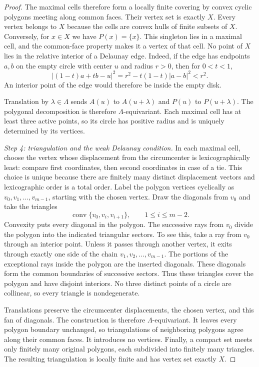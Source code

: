 \documentclass[11pt,a4paper]{article}
\theoremstyle{definition}
\theoremstyle{remark}
\DeclareMathOperator{\conv}{conv}
\begin{document}
\begin{proof}
The maximal cells therefore form a locally finite covering by convex
cyclic polygons meeting along common faces. Their vertex set is exactly
$X$. Every vertex belongs to $X$ because the cells are convex hulls of
finite subsets of $X$. Conversely, for $x\in X$ we have $P(x)=\{x\}$.
This singleton lies in a maximal cell, and the common-face property makes
it a vertex of that cell. No point of $X$ lies in the relative interior of a Delaunay edge.
Indeed, if the edge has endpoints $a,b$ on the empty circle with center
$u$ and radius $r>0$, then for $0<t<1$,
\[
|(1-t)a+tb-u|^2=r^2-t(1-t)|a-b|^2<r^2.
\]
An interior point of the edge would therefore be inside the empty disk.

Translation by $\lambda\in\Lambda$ sends $A(u)$ to $A(u+\lambda)$ and
$P(u)$ to $P(u+\lambda)$. The polygonal decomposition is therefore
$\Lambda$-equivariant. Each maximal cell has at least three active
points, so its circle has positive radius and is uniquely determined by
its vertices.

\smallskip\noindent
\emph{Step 4: triangulation and the weak Delaunay condition.}
In each maximal cell, choose the vertex whose displacement from the
circumcenter is lexicographically least: compare first coordinates, then
second coordinates in case of a tie. This choice is unique because
there are finitely many distinct displacement vectors and lexicographic
order is a total order. Label the polygon vertices cyclically as
$v_0,v_1,\ldots,v_{m-1}$, starting with the chosen vertex. Draw the
diagonals from $v_0$ and take the triangles
\[
\conv\{v_0,v_i,v_{i+1}\},\qquad 1\leq i\leq m-2.
\]
Convexity puts every diagonal in the polygon. The successive rays from $v_0$ divide the polygon into the indicated
triangular sectors. To see this, take a ray from $v_0$ through an interior
point. Unless it passes through another vertex, it exits through exactly
one side of the chain $v_1,v_2,\ldots,v_{m-1}$. The portions of the exceptional rays inside the polygon are the inserted
diagonals. These diagonals form the common boundaries of successive sectors.
Thus these triangles cover the polygon and have disjoint interiors. No three distinct points of a circle are
collinear, so every triangle is nondegenerate.

Translations preserve the circumcenter displacements, the chosen
vertex, and this fan of diagonals. The construction is therefore
$\Lambda$-equivariant. It leaves every polygon boundary unchanged,
so triangulations of neighboring polygons agree along their common
faces. It introduces no vertices. Finally, a compact set meets only
finitely many original polygons, each subdivided into finitely many
triangles. The resulting triangulation is locally finite and has
vertex set exactly $X$.


\end{proof}
\end{document}
